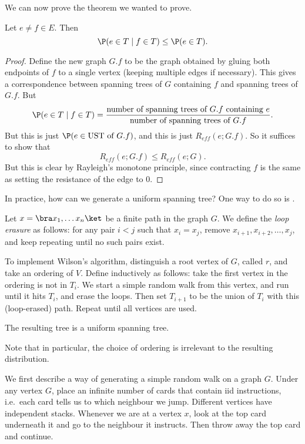 \documentclass[a4paper]{article}
\begin{document}
We can now prove the theorem we wanted to prove.
\begin{thm}
  Let $e \not= f \in E$. Then
  \[
    \P(e \in T \mid f \in T) \leq \P(e \in T).
  \]
\end{thm}

\begin{proof}
  Define the new graph $G.f$ to be the graph obtained by gluing both endpoints of $f$ to a single vertex (keeping multiple edges if necessary). This gives a correspondence between spanning trees of $G$ containing $f$ and spanning trees of $G.f$. But
  \[
    \P(e \in T \mid f \in T) = \frac{\text{number of spanning trees of $G.f$ containing $e$}}{\text{number of spanning trees of $G.f$}}.
  \]
  But this is just $\P(e \in \text{UST of $G.f$})$, and this is just $R_{eff}(e; G .f)$. So it suffices to show that
  \[
    R_{eff}(e; G.f) \leq R_{eff}(e; G).
  \]
  But this is clear by Rayleigh's monotone principle, since contracting $f$ is the same as setting the resistance of the edge to $0$.
\end{proof}

In practice, how can we generate a uniform spanning tree? One way to do so is .

\begin{defi}
  Let $x = \bra x_1, \ldots x_n\ket$ be a finite path in the graph $G$. We define the \emph{loop erasure} as follows: for any pair $i < j$ such that $x_i = x_j$, remove $x_{i + 1}, x_{i+2}, \ldots, x_j$, and keep repeating until no such pairs exist.
\end{defi}

To implement Wilson's algorithm, distinguish a root vertex of $G$, called $r$, and take an ordering of $V$. Define inductively as follows: take the first vertex in the ordering is not in $T_i$. We start a simple random walk from this vertex, and run until it hits $T_i$, and erase the loops. Then set $T_{i + 1}$ to be the union of $T_i$ with this (loop-erased) path. Repeat until all vertices are used.

\begin{thm}[Wilson]
  The resulting tree is a uniform spanning tree.
\end{thm}
Note that in particular, the choice of ordering is irrelevant to the resulting distribution.

We first describe a way of generating a simple random walk on a graph $G$. Under any vertex $G$, place an infinite number of cards that contain iid instructions, i.e.\ each card tells us to which neighbour we jump. Different vertices have independent stacks. Whenever we are at a vertex $x$, look at the top card underneath it and go to the neighbour it instructs. Then throw away the top card and continue.
\end{document}
